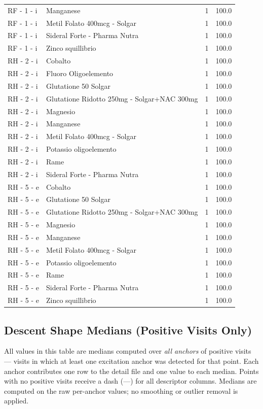 \documentclass[a4paper,11pt]{article}
\begin{document}
\begin{footnotesize}
\begin{longtable}{p{3.5cm}p{7.5cm}rr}
RF - 1 - i & Manganese & 1 & 100.0 \\
RF - 1 - i & Metil Folato 400mcg - Solgar & 1 & 100.0 \\
RF - 1 - i & Sideral Forte - Pharma Nutra & 1 & 100.0 \\
RF - 1 - i & Zinco squillibrio & 1 & 100.0 \\
RH - 2 - i & Cobalto & 1 & 100.0 \\
RH - 2 - i & Fluoro Oligoelemento & 1 & 100.0 \\
RH - 2 - i & Glutatione 50 Solgar & 1 & 100.0 \\
RH - 2 - i & Glutatione Ridotto 250mg - Solgar+NAC 300mg & 1 & 100.0 \\
RH - 2 - i & Magnesio & 1 & 100.0 \\
RH - 2 - i & Manganese & 1 & 100.0 \\
RH - 2 - i & Metil Folato 400mcg - Solgar & 1 & 100.0 \\
RH - 2 - i & Potassio oligoelemento & 1 & 100.0 \\
RH - 2 - i & Rame & 1 & 100.0 \\
RH - 2 - i & Sideral Forte - Pharma Nutra & 1 & 100.0 \\
RH - 5 - e & Cobalto & 1 & 100.0 \\
RH - 5 - e & Glutatione 50 Solgar & 1 & 100.0 \\
RH - 5 - e & Glutatione Ridotto 250mg - Solgar+NAC 300mg & 1 & 100.0 \\
RH - 5 - e & Magnesio & 1 & 100.0 \\
RH - 5 - e & Manganese & 1 & 100.0 \\
RH - 5 - e & Metil Folato 400mcg - Solgar & 1 & 100.0 \\
RH - 5 - e & Potassio oligoelemento & 1 & 100.0 \\
RH - 5 - e & Rame & 1 & 100.0 \\
RH - 5 - e & Sideral Forte - Pharma Nutra & 1 & 100.0 \\
RH - 5 - e & Zinco squillibrio & 1 & 100.0 \\
\end{longtable}
\end{footnotesize}

\subsection{Descent Shape Medians (Positive Visits Only)}

All values in this table are medians computed over \emph{all anchors} of positive visits ---
visits in which at least one excitation anchor was detected for that point. Each anchor
contributes one row to the detail file and one value to each median. Points with no positive
visits receive a dash (---) for all descriptor columns.
Medians are computed on the raw per-anchor values; no smoothing or outlier removal is
applied.
\end{document}

